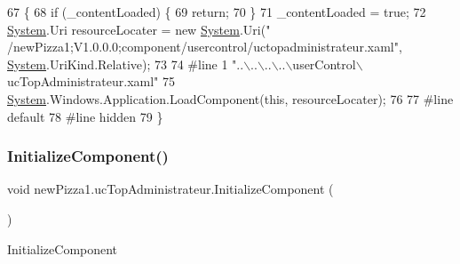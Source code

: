 \begin{DoxyCode}
67                                           \{
68             \textcolor{keywordflow}{if} (\_contentLoaded) \{
69                 \textcolor{keywordflow}{return};
70             \}
71             \_contentLoaded = \textcolor{keyword}{true};
72             \hyperlink{namespaceSystem}{System}.Uri resourceLocater = \textcolor{keyword}{new} \hyperlink{namespaceSystem}{System}.Uri(\textcolor{stringliteral}{"
      /newPizza1;V1.0.0.0;component/usercontrol/uctopadministrateur.xaml"}, \hyperlink{namespaceSystem}{System}.UriKind.Relative);
73             
74 \textcolor{preprocessor}{            #line 1 "..\(\backslash\)..\(\backslash\)..\(\backslash\)..\(\backslash\)userControl\(\backslash\)ucTopAdministrateur.xaml"}
75             \hyperlink{namespaceSystem}{System}.Windows.Application.LoadComponent(\textcolor{keyword}{this}, resourceLocater);
76             
77 \textcolor{preprocessor}{            #line default}
78 \textcolor{preprocessor}{            #line hidden}
79         \}
\end{DoxyCode}
\mbox{\label{classnewPizza1_1_1ucTopAdministrateur_a79b4fb5df50a0755f8616ccd6d462953}} 
\subsubsection{\texorpdfstring{Initialize\+Component()}{InitializeComponent()}\hspace{0.1cm}{\footnotesize\ttfamily [4/4]}}
{\footnotesize\ttfamily void new\+Pizza1.\+uc\+Top\+Administrateur.\+Initialize\+Component (\begin{DoxyParamCaption}{ }\end{DoxyParamCaption})\hspace{0.3cm}{\ttfamily [inline]}}



Initialize\+Component 


